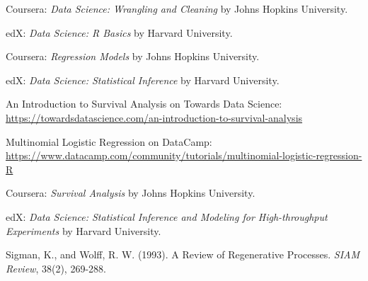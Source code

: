 \begin{thebibliography}{99}
 Coursera: \textit{Data Science: Wrangling and Cleaning} by Johns Hopkins University.

 edX: \textit{Data Science: R Basics} by Harvard University.

 Coursera: \textit{Regression Models} by Johns Hopkins University.

 edX: \textit{Data Science: Statistical Inference} by Harvard University.

 An Introduction to Survival Analysis on Towards Data Science: \url{https://towardsdatascience.com/an-introduction-to-survival-analysis}

 Multinomial Logistic Regression on DataCamp: \url{https://www.datacamp.com/community/tutorials/multinomial-logistic-regression-R}

 Coursera: \textit{Survival Analysis} by Johns Hopkins University.

 edX: \textit{Data Science: Statistical Inference and Modeling for High-throughput Experiments} by Harvard University.

 Sigman, K., and Wolff, R. W. (1993). A Review of Regenerative Processes. \textit{SIAM Review}, 38(2), 269-288.

\end{thebibliography}
